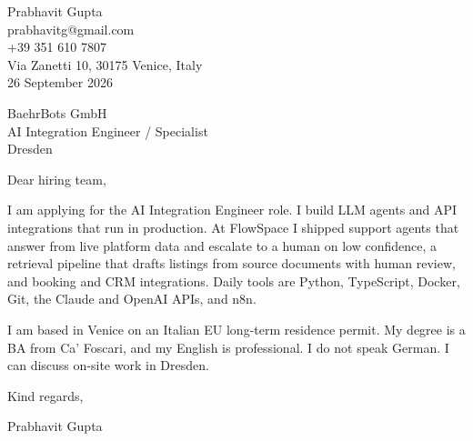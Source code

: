 \documentclass[11pt]{article}
\begin{document}
Prabhavit Gupta\\
prabhavitg@gmail.com\\
+39 351 610 7807\\
Via Zanetti 10, 30175 Venice, Italy\\
26 September 2026

BaehrBots GmbH\\
AI Integration Engineer / Specialist\\
Dresden

Dear hiring team,

I am applying for the AI Integration Engineer role. I build LLM agents and API integrations that run in production. At FlowSpace I shipped support agents that answer from live platform data and escalate to a human on low confidence, a retrieval pipeline that drafts listings from source documents with human review, and booking and CRM integrations. Daily tools are Python, TypeScript, Docker, Git, the Claude and OpenAI APIs, and n8n.

I am based in Venice on an Italian EU long-term residence permit. My degree is a BA from Ca' Foscari, and my English is professional. I do not speak German. I can discuss on-site work in Dresden.

Kind regards,

Prabhavit Gupta
\end{document}
